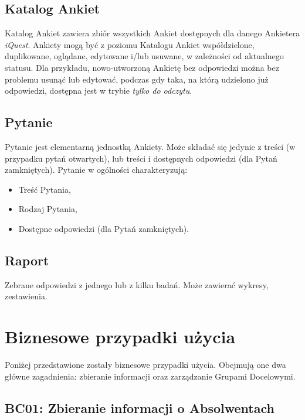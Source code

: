 \subsection{Katalog Ankiet}
\label{Chapter234}

Katalog Ankiet zawiera zbiór wszystkich Ankiet dostępnych dla danego Ankietera \textit{iQuest}. Ankiety mogą być z poziomu Katalogu Ankiet współdzielone, duplikowane, oglądane, edytowane i\slash lub usuwane, w zależności od aktualnego statusu. Dla przykładu, nowo-utworzoną Ankietę bez odpowiedzi można bez problemu usunąć lub edytować, podczas gdy taka, na którą udzielono już odpowiedzi, dostępna jest w trybie \textit{tylko do odczytu}.

\subsection{Pytanie}
\label{Chapter235}

Pytanie jest elementarną jednostką Ankiety. Może składać się jedynie z treści (w przypadku pytań otwartych), lub treści i dostępnych odpowiedzi (dla Pytań zamkniętych). Pytanie w ogólności charakteryzują:

\begin{itemize}
\item Treść Pytania,
\item Rodzaj Pytania,
\item Dostępne odpowiedzi (dla Pytań zamkniętych).
\end{itemize}

\subsection{Raport}
\label{Chapter236}

Zebrane odpowiedzi z jednego lub z kilku badań. Może zawierać wykresy, zestawienia.

\pagebreak
\section{Biznesowe przypadki użycia}
\label{Chapter24}

Poniżej przedstawione zostały biznesowe przypadki użycia. Obejmują one dwa główne zagadnienia: zbieranie informacji oraz zarządzanie Grupami Docelowymi.

\subsection{BC01: Zbieranie informacji o Absolwentach}
\label{Chapter241}

